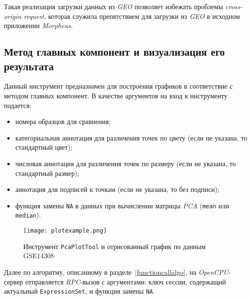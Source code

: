 Такая реализация загрузки данных из \emph{GEO} позволяет избежать проблемы \emph{cross-origin request}, которая служила препятствием для загрузки из \emph{GEO} в исходном приложении \emph{Morpheus}. 


\subsection{Метод главных компонент и визуализация его результата}
Данный инструмент предназначен для построения графиков в соответствие с методом главных компонент.
В качестве аргументов на вход к инструменту подается:
\begin{itemize}
\item номера образцов для сравнения;
\item категориальная аннотация для различения точек по цвету (если не указана, то стандартный цвет);
\item числовая аннотация для различения точек по размеру (если не указана, то стандартный размер);
\item аннотация для подписей к точкам (если не указана, то без подписи);
\item функция замены \texttt{NA} в данных при вычислении матрицы \emph{PCA} (\texttt{mean} или \texttt{median}).
\end{itemize}

\begin{figure}[h]
  \caption{Инструмент \texttt{PcaPlotTool} и отрисованный график по данным GSE14308}
  \texttt{[image: plotexample.png]}
  \label{plotexample}
\end{figure}

Далее по алгоритму, описанному в разделе~\ref{functioncallalgo}, на \emph{OpenCPU}-сервер отправляется \emph{RPC}-вызов с аргументами: ключ сессии, содержащий актуальный \texttt{ExpressionSet}, и функция замены \texttt{NA}.

